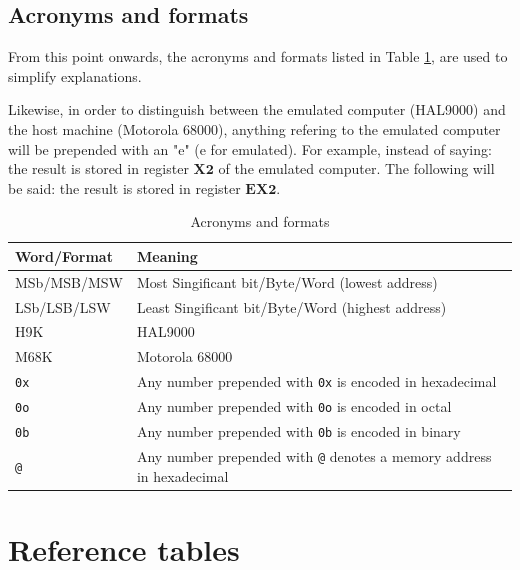 \documentclass[11pt, a4paper]{article}
\begin{document}
\pagebreak
\subsection{Acronyms and formats}
From this point onwards, the acronyms and formats listed in Table \ref{table:acronyms}, are
used to simplify explanations.

Likewise, in order to distinguish between the emulated computer (HAL9000) and the
host machine (Motorola 68000), anything refering to the emulated computer will be prepended with an
"e" (e for emulated). For example, instead of saying: the result is stored in register $\mathbf{X2}$ of the
emulated computer. The following will be said: the result is stored in register $\mathbf{EX2}$.
\begin{table}[ht]
	\centering
	{
		\selectfont
		\begin{tabular}{ | l | l | }
			\hline
			\textbf{Word/Format} & \textbf{Meaning} \\
			\hline
			MSb/MSB/MSW & Most Singificant bit/Byte/Word (lowest address) \\
			\hline
			LSb/LSB/LSW & Least Singificant bit/Byte/Word (highest address) \\
			\hline
			H9K & HAL9000 \\
			\hline
			M68K & Motorola 68000 \\
			\hline
			\verb|0x| & Any number prepended with \verb|0x| is encoded in hexadecimal \\
			\hline
			\verb|0o| & Any number prepended with \verb|0o| is encoded in octal \\
			\hline
			\verb|0b| & Any number prepended with \verb|0b| is encoded in binary \\
			\hline
			\verb|@| & Any number prepended with \verb|@| denotes a memory address in hexadecimal \\
			\hline
		\end{tabular}
	}
	\caption{Acronyms and formats}
	\label{table:acronyms}
\end{table}

\section{Reference tables}
\end{document}
